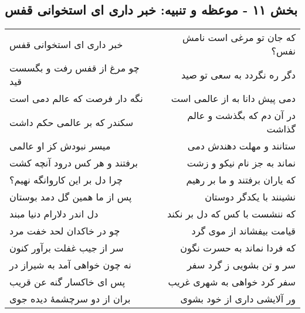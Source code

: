 \begin{center}
\section*{بخش ۱۱ - موعظه و تنبیه: خبر داری ای استخوانی قفس}
\label{sec:011}
\begin{longtable}{l p{0.5cm} r}
خبر داری ای استخوانی قفس
&&
که جان تو مرغی است نامش نفس؟
\\
چو مرغ از قفس رفت و بگسست قید
&&
دگر ره نگردد به سعی تو صید
\\
نگه دار فرصت که عالم دمی است
&&
دمی پیش دانا به از عالمی است
\\
سکندر که بر عالمی حکم داشت
&&
در آن دم که بگذشت و عالم گذاشت
\\
میسر نبودش کز او عالمی
&&
ستانند و مهلت دهندش دمی
\\
برفتند و هر کس درود آنچه کشت
&&
نماند به جز نام نیکو و زشت
\\
چرا دل بر این کاروانگه نهیم؟
&&
که یاران برفتند و ما بر رهیم
\\
پس از ما همین گل دمد بوستان
&&
نشینند با یکدگر دوستان
\\
دل اندر دلارام دنیا مبند
&&
که ننشست با کس که دل بر نکند
\\
چو در خاکدان لحد خفت مرد
&&
قیامت بیفشاند از موی گرد
\\
سر از جیب غفلت برآور کنون
&&
که فردا نماند به حسرت نگون
\\
نه چون خواهی آمد به شیراز در
&&
سر و تن بشویی ز گرد سفر
\\
پس ای خاکسار گنه عن قریب
&&
سفر کرد خواهی به شهری غریب
\\
بران از دو سرچشمهٔ دیده جوی
&&
ور آلایشی داری از خود بشوی
\\
\end{longtable}
\end{center}
